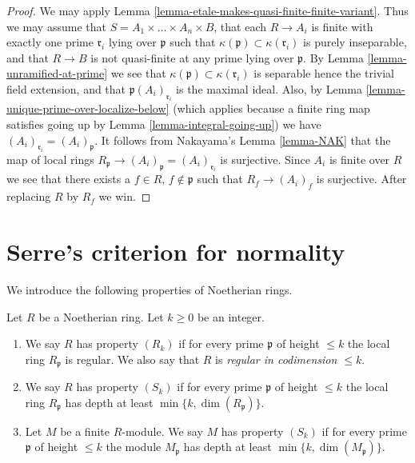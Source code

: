 \begin{proof}
We may apply Lemma \ref{lemma-etale-makes-quasi-finite-finite-variant}.
Thus we may assume that $S = A_1 \times \ldots \times A_n \times B$,
that each $R \to A_i$ is finite with exactly one prime $\mathfrak r_i$
lying over $\mathfrak p$ such that
$\kappa(\mathfrak p) \subset \kappa(\mathfrak r_i)$ is purely inseparable,
and that $R \to B$ is not quasi-finite at any prime lying over $\mathfrak p$.
By Lemma \ref{lemma-unramified-at-prime} we see that
$\kappa(\mathfrak p) \subset \kappa(\mathfrak r_i)$
is separable hence the trivial field extension, and that
$\mathfrak p(A_i)_{\mathfrak r_i}$ is the maximal ideal.
Also, by Lemma \ref{lemma-unique-prime-over-localize-below}
(which applies because a finite ring map satisfies going up by
Lemma \ref{lemma-integral-going-up})
we have $(A_i)_{\mathfrak r_i} = (A_i)_{\mathfrak p}$.
It follows from Nakayama's Lemma \ref{lemma-NAK}
that the map of local rings
$R_{\mathfrak p} \to (A_i)_{\mathfrak p} = (A_i)_{\mathfrak r_i}$
is surjective. Since $A_i$ is finite over $R$ we see that there
exists a $f \in R$, $f \not \in \mathfrak p$ such that
$R_f \to (A_i)_f$ is surjective. After replacing $R$ by $R_f$ we win.
\end{proof}
















\section{Serre's criterion for normality}
\label{section-serre-criterion}

\noindent
We introduce the following properties of Noetherian rings.

\begin{definition}
\label{definition-conditions}
Let $R$ be a Noetherian ring.
Let $k \geq 0$ be an integer.
\begin{enumerate}
\item We say $R$ has property {\it $(R_k)$} if for every prime $\mathfrak p$
of height $\leq k$ the local ring $R_{\mathfrak p}$ is regular.
We also say that $R$ is {\it regular in codimension $\leq k$}.
\item We say $R$ has property {\it $(S_k)$} if for every prime $\mathfrak p$
of height $\leq k$ the local ring $R_{\mathfrak p}$ has depth at least
$\min\{k, \dim(R_{\mathfrak p})\}$.
\item Let $M$ be a finite $R$-module. We say $M$ has property $(S_k)$
if for every prime $\mathfrak p$ of height $\leq k$ the module
$M_{\mathfrak p}$ has depth at least $\min\{k, \dim(M_{\mathfrak p})\}$.
\end{enumerate}
\end{definition}

